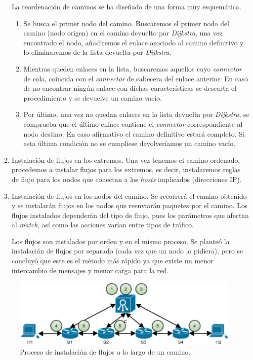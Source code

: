 \documentclass[a4paper,11pt]{book}
\begin{document}
\begin{enumerate}
La reordenación de caminos se ha diseñado de una forma muy esquemática.

\begin{enumerate}
\item Se busca el primer nodo del camino. Buscaremos el primer nodo del camino (nodo origen) en el camino devuelto por \emph{Dijkstra}, una vez encontrado el nodo, añadiremos el enlace asociado al camino definitivo y lo eliminaremos de la lista devuelta por \emph{Dijkstra}.
\item Mientras queden enlaces en la lista, buscaremos aquellos cuyo \emph{connector} de cola, coincida con el \emph{connector} de cabecera del enlace anterior. En caso de no encontrar ningún enlace con dichas características se descarta el procedimiento y se devuelve un camino vacío.
\item Por último, una vez no quedan enlaces en la lista devuelta por \emph{Dijkstra}, se comprueba que el último enlace contiene el \emph{connector} correspondiente al nodo destino. En caso afirmativo el camino definitivo estará completo. Si esta última condición no se cumpliese devolveríamos un camino vacío.
\end{enumerate}

\item Instalación de flujos en los extremos. Una vez tenemos el camino ordenado, procedemos a instalar flujos para los extremos, es decir, instalaremos reglas de flujo para los nodos que conectan a los \textit{hosts} implicados (direcciones \ac{IP}).

\item Instalación de flujos en los nodos del camino. Se recorrerá el camino obtenido y se instalarán flujos en los nodos que reenviarán paquetes por el camino. Los flujos instalados dependerán del tipo de flujo, pues los parámetros que afectan al \textit{match}, así como las acciones varían entre tipos de tráfico.

Los flujos son instalados por orden y en el mismo proceso. Se planteó la instalación de flujos por separado (cada vez que un nodo lo pidiera), pero se concluyó que este es el método más rápido ya que existe un menor intercambio de mensajes y menor carga para la red.

\end{enumerate}

\begin{figure}[tb]
\centering

\includegraphics[scale=0.8]{./figuras/installFlow}
\caption{Proceso de instalación de flujos a lo largo de un camino.}\label{installFlow}
\end{figure}
%
%
\end{document}
